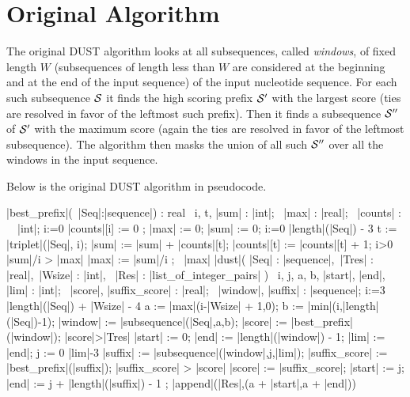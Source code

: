 \documentclass{article}
\newcommand{\cals}{{\cal S}}
\newcommand{\OF}{\ \keyword{of}\ }
\newcommand{\RET}{\keyword{return}\ }
\newcommand{\VARP}{\keyword{var}\ }
\begin{document}
\section{Original Algorithm}

The original DUST algorithm looks at all subsequences, called {\em windows},
of fixed length $W$ (subsequences of length less than $W$ are considered at 
the beginning and at the end of the input sequence) of the input nucleotide 
sequence.  For each such subsequence $\cals$ it finds the high scoring prefix 
$\cals'$ with the largest score (ties are resolved in favor of the leftmost
such prefix). Then it finds a subsequence $\cals''$ of $\cals'$ with the maximum
score (again the ties are resolved in favor of the leftmost subsequence). 
The algorithm then masks the union of all such $\cals''$ over all the windows
in the input sequence.

Below is the original DUST algorithm in pseudocode.

\NumberProgramstrue
\begin{program}
\BEGIN
\FUNCT |best_prefix|(\VARP |Seq|:|sequence|) : real \BODY
    \BEGIN
    \VARP i, t, |sum| : |int|;
    \VARP |max| : |real|;
    \VARP |counts| : \ARRAY [0..63] \OF |int|;
    \FOR i:=0  \DO |counts|[i] := 0 \OD;
    |max| := 0;
    |sum| := 0;
    \FOR i:=0 \TO |length|(|Seq|) - 3 \DO
        t           := |triplet|(|Seq|, i);
        |sum|       := |sum| + |counts|[t];
        |counts|[t] := |counts|[t] + 1;
        \IF i>0 \AND |sum|/i > |max| \THEN |max| := |sum|/i \FI
    \OD;
    \RET |max|
    \END
\ENDFUNCT
\PROC |dust|( |Seq| : |sequence|,\ |Tres| : |real|,\ |Wsize| : |int|,
             \VARP |Res| : |list_of_integer_pairs| )\BODY
    \BEGIN
    \VARP i, j, a, b, |start|, |end|, |lim| : |int|;
    \VARP |score|, |suffix_score| : |real|;
    \VARP |window|, |suffix| : |sequence|;
    \FOR i:=3 \TO |length|(|Seq|) + |Wsize| - 4 \DO
        a        := |max|(i-|Wsize| + 1,0);
        b        := |min|(i,|length|(|Seq|)-1);
        |window| := |subsequence|(|Seq|,a,b);
        |score|  := |best_prefix|(|window|);
        \IF |score|>|Tres| 
        \THEN |start| := 0;
              |end|   := |length|(|window|) - 1;
              |lim|   := |end|;
              \FOR j := 0 \TO |lim|-3 \DO
                |suffix|       := |subsequence|(|window|,j,|lim|);
                |suffix_score| := |best_prefix|(|suffix|);
                \IF |suffix_score| > |score|
                \THEN |score| := |suffix_score|;
                      |start| := j;
                      |end|   := j + |length|(|suffix|) - 1
                \FI
              \OD;
              |append|(|Res|,(a + |start|,a + |end|))
        \FI
    \OD
    \END
\ENDPROC
\END
\end{program}
\end{document}
